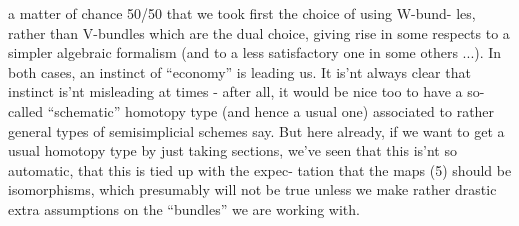 
a matter of chance 50/50  that we took first the choice of using W-bund-%
les,  rather than V\xout{(}-bundles which are the dual choice,  giving rise in
some respects to a simpler algebraic formalism (and to a 
less satisfactory one in some others ...).  In both cases,  an instinct
of ``economy'' is leading us.  It is'nt always clear that instinct is'nt
misleading at times - after all,  it would be nice too to have a so-%
called ``schematic'' homotopy type (and hence a usual one) associated to
rather general types of semisimplicial schemes say.  But here already,
if we want to get a usual homotopy type by just taking sections,  we've
seen that this is'nt so automatic,  that this is tied up with the expec-%
tation that the maps (5) should be isomorphisms,  which presumably will
not be true unless we make rather drastic extra assumptions on the
``bundles'' we are working with.


